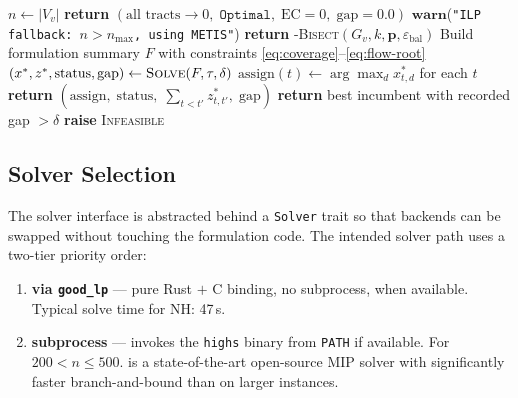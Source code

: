 \begin{algorithm}[t]
\caption{\ilp{}-\textsc{Bisect}($G_v$, $k$, $\mathbf{p}$,
  $\varepsilon_{\mathrm{bal}}$, $\tau$, $\delta$, $n_{\max}$)}
\label{alg:ilp}
\begin{algorithmic}[1]
\State $n \gets |V_v|$
  \textbf{return} $(\text{all tracts} \to 0,\; \texttt{Optimal},\; \text{EC}=0,\; \text{gap}=0.0)$
\EndIf
{}
  \State $\mathbf{warn}$(\texttt{"ILP fallback: $n > n_{\max}$, using METIS"})
  \State \textbf{return} \metis{}-\textsc{Bisect}$(G_v, k, \mathbf{p}, \varepsilon_{\mathrm{bal}})$
\EndIf
\State Build formulation summary $F$ with constraints
  \eqref{eq:coverage}--\eqref{eq:flow-root}
\State $(x^*, z^*, \text{status}, \text{gap}) \gets \textsc{Solve}(F, \tau, \delta)$
  \State $\mathrm{assign}(t) \gets \arg\max_d x^*_{t,d}$ for each $t$
  \State \textbf{return} $(\mathrm{assign},\; \text{status},\; \sum_{t<t'} z^*_{t,t'},\; \text{gap})$
  \State \textbf{return} best incumbent with recorded gap $> \delta$
\Else
  \textbf{raise} \textsc{Infeasible}
\EndIf
\end{algorithmic}
\end{algorithm}

\subsection{Solver Selection}

The solver interface is abstracted behind a \texttt{Solver} trait so that
backends can be swapped without touching the formulation code.
The intended solver path uses a two-tier priority order:

\begin{enumerate}
\item \textbf{\glpk{} via \texttt{good\_lp}} --- pure Rust $+$ C binding,
  no subprocess, when available.
  Typical solve time for NH: 47\,s.

\item \textbf{\highs{} subprocess} --- invokes the \texttt{highs} binary
  from \texttt{PATH} if available.
  For $200 < n \leq 500$.
  \highs{} is a state-of-the-art open-source MIP solver with significantly
  faster branch-and-bound than \glpk{} on larger instances.
\end{enumerate}

